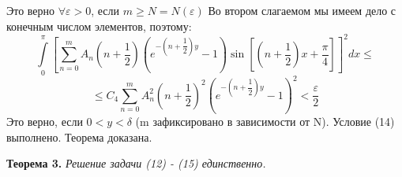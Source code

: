 \documentclass[12pt, a4paper]{article}
\begin{document}
	Это верно $\forall \varepsilon > 0$, если $m \geq N =N(\varepsilon)$\newline
	Во втором слагаемом мы имеем дело с конечным числом элементов, поэтому:
	\begin{equation*}
		\int\limits_0^\pi \left[	\sum\limits_{n=0}^{m} A_n\left(n+\dfrac12\right) \left( e^{-\left(n+\dfrac12\right)y} - 1\right) \sin{\left[\left(n+\dfrac12\right) x  + \dfrac\pi4\right]} \right]^2 dx \leq
	\end{equation*}
	\begin{equation*}
		\leq C_4 \sum\limits_{n=0}^{m} A_n^2 \left(n +\dfrac12\right)^2 \left(e^{-\left(n+\dfrac12\right)y} - 1\right)^2 < \dfrac{\varepsilon}{2}
	\end{equation*}
	Это верно, если $0 < y < \delta$ (m зафиксировано в зависимости от N). Условие (14) выполнено. Теорема доказана.

\textbf{Теорема 3.} \textit{Решение задачи (12) - (15) единственно.}
\end{document}
